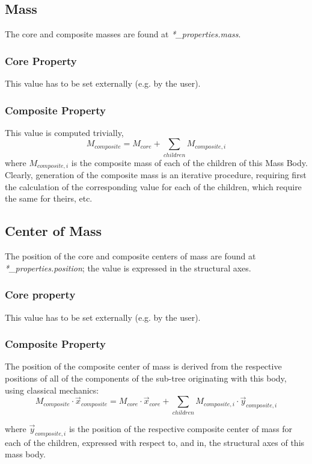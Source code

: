\subsection {Mass}
The core and composite masses are found at \textit{*\_properties.mass}.
\subsubsection {Core Property}
This value has to be set externally (e.g. by the user).
\subsubsection {Composite Property}
This value is computed trivially,
\begin{equation}
  M_{composite} = M_{core} + \sum_{children} M_{composite,i}
\end{equation}
where $M_{composite,i}$ is the composite mass of each of the children of this
Mass Body.  Clearly, generation of the composite mass is an iterative
procedure, requiring first the calculation of the corresponding value for each
of the children, which require the same for theirs, etc.

\subsection{Center of Mass}
The position of the core and composite centers of mass are found at
\textit{*\_properties.position}; the value is expressed in the structural axes.
\subsubsection {Core property}
This value has to be set externally (e.g. by the user).
\subsubsection {Composite Property}
The position of the composite center of mass is derived from the respective
positions of all of the components of the sub-tree originating with this body,
using classical mechanics:
\begin{equation}
{M_{composite}} \cdot \vec{x}_{composite} = M_{core}  \cdot \vec{x}_{core}  +
\sum_{children}{M_{composite,i} \cdot \vec{y}_{composite,i} }
\label{CoM_cal}
\end{equation}

where $\vec{y}_{composite,i} $ is the position of the respective composite
center of mass for each of the children, expressed with respect to, and in,
the structural axes of this mass body.

